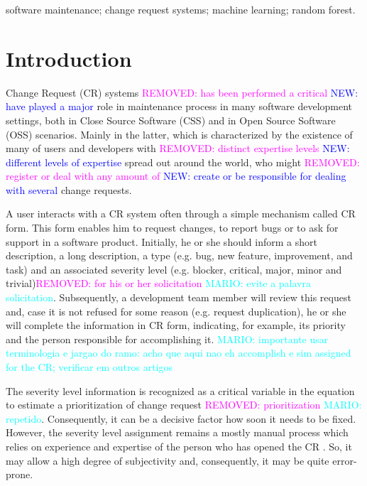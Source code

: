 \documentclass[10pt, conference]{IEEEtran}
\newcommand{\mario}[1]{\noindent\textcolor{cyan}{MARIO: {#1}}}
\newcommand{\rem}[1]{\noindent\textcolor{magenta}{REMOVED: {#1}}}
\newcommand{\new}[1]{\noindent\textcolor{blue}{NEW: {#1}}}
\newcommand{\mario}[1]{}
\newcommand{\rem}[1]{}
\newcommand{\new}[1]{#1}
\begin{document}
\begin{IEEEkeywords}
software maintenance; change request systems; machine learning; random forest.
\end{IEEEkeywords}


%
\IEEEpeerreviewmaketitle



\section{Introduction}
Change Request (CR) systems \rem{has been performed a critical} \new{have played a major} role in maintenance process in many software development settings, both in Close Source Software (CSS) and in Open Source Software (OSS) scenarios. Mainly in the latter, which is characterized by the existence of many of users and developers with \rem{distinct expertise levels} \new{different levels of expertise} spread out around the world, who might \rem{register or deal with any amount of} \new{create or be responsible for dealing with several} change requests\cite{Cavalcanti2014}. 

A user interacts with a CR system often through a simple mechanism called CR form. This form enables him to request changes, to report bugs or to ask for support in a software product\cite{Sommerville2010}. Initially, he or she should inform a short description, a long description, a type (e.g. bug, new feature, improvement, and task) and an associated severity level (e.g. blocker, critical, major, minor and trivial)\rem{ for his or her solicitation} \mario{evite a palavra solicitation}. Subsequently, a development team member will review this request and, case it is not refused for some reason (e.g. request duplication), he or she will complete the information in CR form, indicating, for example, its priority and the person responsible for accomplishing it. \mario{importante usar terminologia e jargao do ramo: acho que aqui nao eh accomplish e sim assigned for the CR; verificar em outros artigos}

The severity level information is recognized as a critical variable in the equation to estimate a prioritization of change request \rem{prioritization}\cite{Tian2012} \mario{repetido}. Consequently, it can be a decisive factor how soon it needs to be fixed\cite{Lamkanfi2010}. However, the severity level assignment remains a mostly manual process which relies on experience and expertise of the person who has opened the CR \cite{Cavalcanti2014, Tian2012, Lamkanfi2010}. So, it may allow a high degree of subjectivity and, consequently, it may be quite error-prone. 
\end{document}
